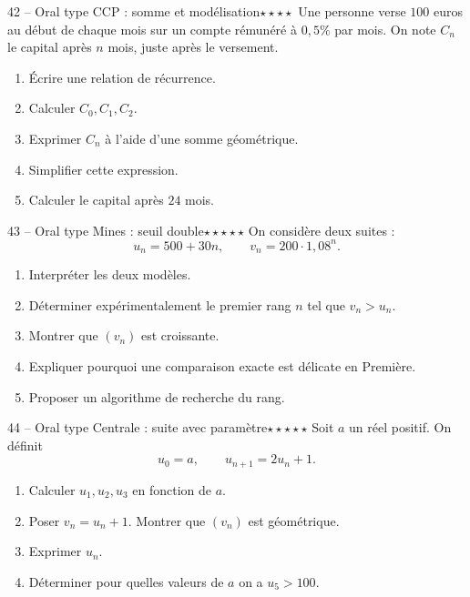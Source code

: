 \documentclass[11pt,a4paper]{article}
\newcommand{\quatreetoiles}{\(\star\star\star\star\)}
\newcommand{\cinqetoiles}{\(\star\star\star\star\star\)}
\begin{document}
\begin{exobox}{42 -- Oral type CCP : somme et modélisation}{\quatreetoiles}
Une personne verse \(100\) euros au début de chaque mois sur un compte rémunéré à \(0{,}5\%\) par mois. On note \(C_n\) le capital après \(n\) mois, juste après le versement.
\begin{enumerate}[label=\alph*)]
  \item Écrire une relation de récurrence.
  \item Calculer \(C_0,C_1,C_2\).
  \item Exprimer \(C_n\) à l'aide d'une somme géométrique.
  \item Simplifier cette expression.
  \item Calculer le capital après \(24\) mois.
\end{enumerate}
\end{exobox}

\begin{exobox}{43 -- Oral type Mines : seuil double}{\cinqetoiles}
On considère deux suites :
\[
u_n=500+30n,\qquad v_n=200\cdot 1{,}08^n.
\]
\begin{enumerate}[label=\alph*)]
  \item Interpréter les deux modèles.
  \item Déterminer expérimentalement le premier rang \(n\) tel que \(v_n>u_n\).
  \item Montrer que \((v_n)\) est croissante.
  \item Expliquer pourquoi une comparaison exacte est délicate en Première.
  \item Proposer un algorithme de recherche du rang.
\end{enumerate}
\end{exobox}

\begin{exobox}{44 -- Oral type Centrale : suite avec paramètre}{\cinqetoiles}
Soit \(a\) un réel positif. On définit
\[
u_0=a,\qquad u_{n+1}=2u_n+1.
\]
\begin{enumerate}[label=\alph*)]
  \item Calculer \(u_1,u_2,u_3\) en fonction de \(a\).
  \item Poser \(v_n=u_n+1\). Montrer que \((v_n)\) est géométrique.
  \item Exprimer \(u_n\).
  \item Déterminer pour quelles valeurs de \(a\) on a \(u_5>100\).
\end{enumerate}
\end{exobox}
\end{document}
